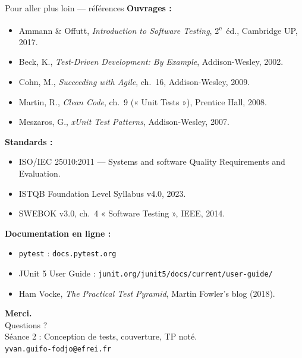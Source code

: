 \documentclass[aspectratio=169,11pt]{beamer}
\begin{document}
\begin{frame}[t]{Pour aller plus loin --- références}
\scriptsize
\textbf{Ouvrages :}
\begin{itemize}\itemsep0.1em
\item Ammann \& Offutt, \emph{Introduction to Software Testing}, 2\textsuperscript{e}~éd., Cambridge UP, 2017.
\item Beck, K., \emph{Test-Driven Development: By Example}, Addison-Wesley, 2002.
\item Cohn, M., \emph{Succeeding with Agile}, ch.~16, Addison-Wesley, 2009.
\item Martin, R., \emph{Clean Code}, ch.~9 (« Unit Tests »), Prentice Hall, 2008.
\item Meszaros, G., \emph{xUnit Test Patterns}, Addison-Wesley, 2007.
\end{itemize}
\vspace{0.3em}
\textbf{Standards :}
\begin{itemize}\itemsep0.1em
\item ISO/IEC 25010:2011 --- Systems and software Quality Requirements and Evaluation.
\item ISTQB Foundation Level Syllabus v4.0, 2023.
\item SWEBOK v3.0, ch.~4 « Software Testing », IEEE, 2014.
\end{itemize}
\vspace{0.3em}
\textbf{Documentation en ligne :}
\begin{itemize}\itemsep0.1em
\item \texttt{pytest} : \texttt{docs.pytest.org}
\item JUnit 5 User Guide : \texttt{junit.org/junit5/docs/current/user-guide/}
\item Ham Vocke, \textit{The Practical Test Pyramid}, Martin Fowler's blog (2018).
\end{itemize}
\end{frame}

\begin{frame}[plain]
\vspace{1.8cm}
\centering
{\color{white}\Huge\bfseries Merci.}\\[0.5cm]
{\color{white}\large Questions ?}\\[1.4cm]
{\color{white!85}\small Séance 2 : Conception de tests, couverture, TP noté.}\\[0.4cm]
{\color{white!75}\scriptsize \texttt{yvan.guifo-fodjo@efrei.fr}}
\vfill
\end{frame}
\end{document}
